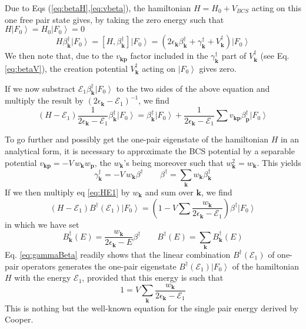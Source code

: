 \documentclass[aps,prb,amsmath,amssymb,superscriptaddress,twocolumn]{revtex4-1}
\newcommand{\vk}{\ensuremath{\mathbf{k}}}
\newcommand{\vp}{\ensuremath{\mathbf{p}}}
\newcommand{\E}{\ensuremath{\mathbf{E}}}
\newcommand{\ket}[1]{\ensuremath{\left|#1\right>}}
\newcommand{\nth}[1]{\ensuremath{\frac{1}{#1}}}
\newcommand{\br}[1]{\ensuremath{\left(#1\right)}}
\newcommand{\mbr}[1]{\ensuremath{\left[#1\right]}}
\newcommand{\com}[2]{\ensuremath{\mbr{#1,#2}}}
\newcommand{\fo}{\ensuremath{\ket{F_0}}}
\renewcommand{\E}{\ensuremath{\mathcal{E}}}
\begin{document}
Due to Eqs (\ref{eq:betaH},\ref{eq:vbeta}), the hamiltonian $H=H_0+V_{BCS}$ acting on this one free pair state gives, by taking the zero energy such that $H\ket{F_0}=H_0\ket{F_0}=0$
\begin{equation}
H\beta^{\dagger}_\vk\fo=\com{H}{\beta^{\dagger}_\vk}\fo=\br{2\epsilon_\vk\beta^{\dagger}_\vk+\gamma^{\dagger}_\vk+V^{\dagger}_\vk}\fo
\end{equation}
We then note that, due to the $v_{\vk\vp}$ factor included in the $\gamma^{\dagger}_{\vk}$ part of $V^{\dagger}_\vk$ (see Eq. \ref{eq:betaV}), the creation potential $V^{\dagger}_\vk$ acting on \fo{ }gives zero.

If we now substract $\E_1\beta^{\dagger}_\vk\fo$ to the two sides of the above equation and multiply the result by $\br{2\epsilon_\vk-\E_1}^{-1}$, we find
\begin{equation}\label{eq:HE1}
(H-\E_1)\nth{2\epsilon_\vk-\E_1}\beta^{\dagger}_\vk\fo=\beta^{\dagger}_\vk\fo+\nth{2\epsilon_\vk-\E_1}\sum{}v_{\vk\vp}\beta^{\dagger}_\vp\fo
\end{equation}

To go further and possibly get the one-pair eigenstate of the hamiltonian $H$ in an analytical form, it is necessary to  approximate the BCS potential by a separable potential $v_{\vk\vp}=-V\,w_\vk{}w_\vp$, the $w_\vk$'s being moreover such that $w_\vk^2=w_\vk$.  This yields
\begin{equation}\label{eq:gammaBeta}
\gamma^{\dagger}_\vk=-V\,w_\vk\beta^{\dagger}\quad\quad\beta^{\dagger}=\sum_\vk{}w_\vk\beta^{\dagger}_\vk
\end{equation}
If we then multiply eq \eqref{eq:HE1} by $w_\vk$ and sum over $\vk$, we find
\begin{equation}
(H-\E_1)B^{\dagger}(\E_1)\fo=\br{1-V\sum{\frac{w_\vk}{2\epsilon_\vk-\E_1}}}\beta^{\dagger}\fo
\end{equation}
in which we have set
\begin{equation}\label{eq:B}
B_\vk^{\dagger}(E)=\frac{w_\vk}{2\epsilon_\vk-E}\beta^{\dagger}\quad\quad B^{\dagger}(E)=\sum_\vk{B_\vk^{\dagger}(E)}
\end{equation}
Eq. \eqref{eq:gammaBeta} readily shows that the linear combination  $B^{\dagger}(\E_1)$ of one-pair operators  generates the one-pair eigenstate $B^{\dagger}(\E_1)\fo$ of the hamiltonian $H$ with the energy $\E_1$, provided that this energy is such that
\begin{equation}\label{eq:SchOne}
1=V\sum_\vk{\frac{w_\vk}{2\epsilon_\vk-\E_1}}
\end{equation}
This is nothing but the well-known equation for the single pair energy derived by Cooper.
\end{document}
